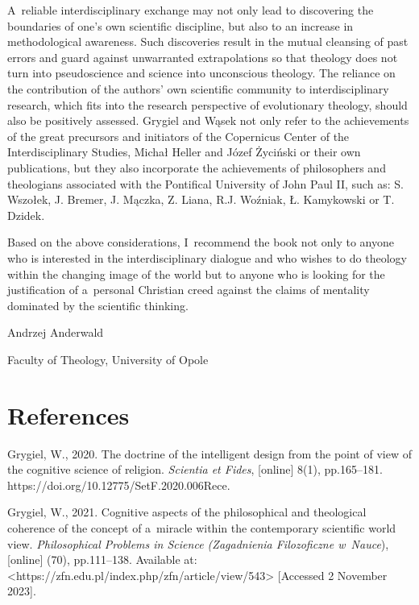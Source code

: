 A~reliable interdisciplinary exchange may not only lead to discovering the boundaries of one's own scientific discipline, but also to an increase in methodological awareness. Such discoveries result in the mutual cleansing of past errors and guard against unwarranted extrapolations so that theology does not turn into pseudoscience and science into unconscious theology. The reliance on the contribution of the authors' own scientific community to interdisciplinary research, which fits into the research perspective of evolutionary theology, should also be positively assessed. Grygiel and Wąsek not only refer to the achievements of the great precursors and initiators of the Copernicus Center of the Interdisciplinary Studies, Michał Heller and Józef Życiński or their own publications, but they also incorporate the achievements of philosophers and theologians associated with the Pontifical University of John Paul II, such as: S. Wszołek, J. Bremer, J. Mączka, Z. Liana, R.J. Woźniak, Ł. Kamykowski or T. Dzidek.



Based on the above considerations, I~recommend the book  not only to anyone who is interested in the interdisciplinary dialogue and who wishes to do theology within the changing image of the world but to anyone who is looking for the justification of a~personal Christian creed against the claims of mentality dominated by the scientific thinking.



Andrzej Anderwald





Faculty of Theology, University of Opole





\section{References}

Grygiel, W., 2020. The doctrine of the intelligent design from the point of view of the cognitive science of religion. \textit{Scientia et Fides}, [online] 8(1), pp.165–181. https://doi.org/10.12775/SetF.2020.006Rece.



Grygiel, W., 2021. Cognitive aspects of the philosophical and theological coherence of the concept of a~miracle within the contemporary scientific world view. \textit{Philosophical Problems in Science (Zagadnienia Filozoficzne w~Nauce}), [online] (70), pp.111–138. Available at: {\textless}https://zfn.edu.pl/index.php/zfn/article/view/543{\textgreater} [Accessed 2 November 2023].



